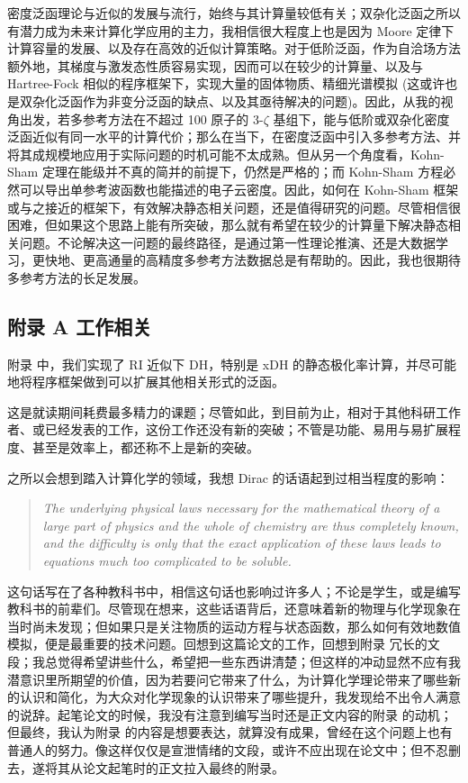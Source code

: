 密度泛函理论与近似的发展与流行，始终与其计算量较低有关；双杂化泛函之所以有潜力成为未来计算化学应用的主力，我相信很大程度上也是因为 Moore 定律下计算容量的发展、以及存在高效的近似计算策略\cite{Almloef-Almloef.CPL.1991, Weigend-Ahlrichs.CPL.1998, Hohenstein-Martinez.JCP.2012, Parrish-Sherrill.JCP.2012}。对于低阶泛函，作为自洽场方法额外地，其梯度与激发态性质容易实现，因而可以在较少的计算量、以及与 Hartree-Fock 相似的程序框架下，实现大量的固体物质、精细光谱模拟 (这或许也是双杂化泛函作为非变分泛函的缺点、以及其亟待解决的问题)。因此，从我的视角出发，若多参考方法在不超过 100 原子的 3-$\zeta$ 基组下，能与低阶或双杂化密度泛函近似有同一水平的计算代价；那么在当下，在密度泛函中引入多参考方法、并将其成规模地应用于实际问题的时机可能不太成熟。但从另一个角度看，Kohn-Sham 定理在能级并不真的简并的前提下，仍然是严格的；而 Kohn-Sham 方程必然可以导出单参考波函数也能描述的电子云密度。因此，如何在 Kohn-Sham 框架或与之接近的框架下，有效解决静态相关问题，还是值得研究的问题。尽管相信很困难，但如果这个思路上能有所突破，那么就有希望在较少的计算量下解决静态相关问题。不论解决这一问题的最终路径，是通过第一性理论推演、还是大数据学习，更快地、更高通量的高精度多参考方法数据总是有帮助的。因此，我也很期待多参考方法的长足发展。

\subsection*{附录 A 工作相关}

附录  中，我们实现了 RI 近似下 DH，特别是 xDH 的静态极化率计算，并尽可能地将程序框架做到可以扩展其他相关形式的泛函。

这是就读期间耗费最多精力的课题；尽管如此，到目前为止，相对于其他科研工作者、或已经发表的工作，这份工作还没有新的突破；不管是功能、易用与易扩展程度、甚至是效率上，都还称不上是新的突破。

之所以会想到踏入计算化学的领域，我想 Dirac 的话语起到过相当程度的影响\cite{Dirac-Dirac.PRSLA.1929}：
\begin{quotation}
    \it
    The underlying physical laws necessary for the mathematical theory of a large part of physics and the whole of chemistry are thus completely known, and the difficulty is only that the exact application of these laws leads to equations much too complicated to be soluble.
\end{quotation}
这句话写在了各种教科书中，相信这句话也影响过许多人；不论是学生，或是编写教科书的前辈们。尽管现在想来，这些话语背后，还意味着新的物理与化学现象在当时尚未发现；但如果只是关注物质的运动方程与状态函数，那么如何有效地数值模拟，便是最重要的技术问题。回想到这篇论文的工作，回想到附录  冗长的文段；我总觉得希望讲些什么，希望把一些东西讲清楚；但这样的冲动显然不应有我潜意识里所期望的价值，因为若要问它带来了什么，为计算化学理论带来了哪些新的认识和简化，为大众对化学现象的认识带来了哪些提升，我发现给不出令人满意的说辞。起笔论文的时候，我没有注意到编写当时还是正文内容的附录  的动机；但最终，我认为附录  的内容是想要表达，就算没有成果，曾经在这个问题上也有普通人的努力。像这样仅仅是宣泄情绪的文段，或许不应出现在论文中；但不忍删去，遂将其从论文起笔时的正文拉入最终的附录。

